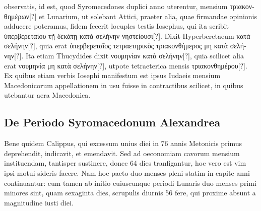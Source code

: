 observatis, id est, quod Syromecedones duplici anno uterentur, mensium
\textgreek{τριακονθημέρων[?]}
 et Lunarium, ut solebant Attici, praeter alia, quae firmandae
opinionis adducere poteramus, fidem fecerit locuples testis Iosephus,
qui ita scribit
 \textgreek{ὑπερβερεταίου τῇ δεκάτῃ κατὰ σελήνην νηστείουσι[?]}.
Dixit Hyperberetaeum
\textgreek{κατὰ σελήνην[?]}, quia erat
 \textgreek{ὑπερβερεταῖος τετραετηρικὸς τριακονθήμερος
μη κατὰ σελήνην[?]}.
Ita etiam Thucydides dixit \textgreek{νουμηνίαν κατὰ σελήνην[?]},
quia scilicet alia erat \textgreek{νουμηνία μη κατὰ σελήνην[?]},
 utpote tetraeterica mensis
\textgreek{τριακονθημέρου[?]}.
Ex quibus etiam verbis Iosephi manifestum est ipsus Iudaeis
mensium Macedonicorum appellationem in usu fuisse in contractibus
scilicet, in quibus utebantur aera Macedonica.

\subsection{De Periodo Syromacedonum Alexandrea}
Bene quidem Calippus, qui excessum unius diei in 76 annis Metonicis
primus deprehendit, indicavit, et emendavit.
Sed ad oeconomiam
cavorum mensium instituendam, tantisper sustinere, donec 64
dies tranfigantur, hoc vero est vim ipsi motui sideris facere.
Nam hoc
pacto duo menses pleni statim in capite anni continuantur: cum tamen
ab initio cuiuscunque periodi Lunaris duo menses primi minores sint,
quam sexaginta dies, scrupulis diurnis 56 fere, qui proxime absunt a
magnitudine iusti diei.

